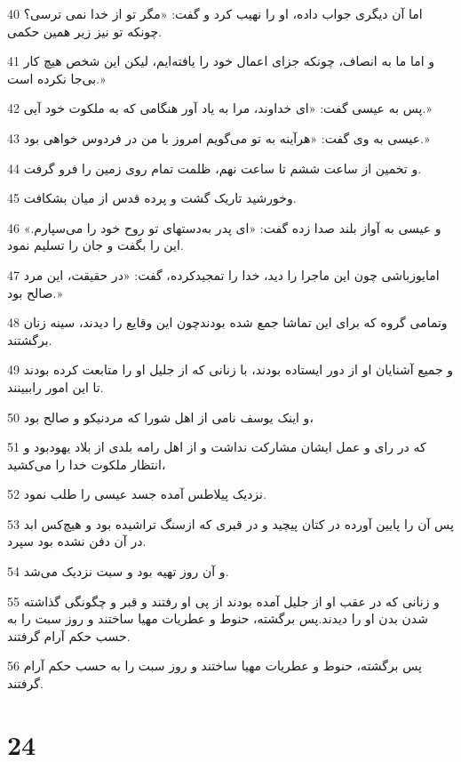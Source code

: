\par 40 اما آن دیگری جواب داده، او را نهیب کرد و گفت: «مگر تو از خدا نمی ترسی؟ چونکه تو نیز زیر همین حکمی.
\par 41 و اما ما به انصاف، چونکه جزای اعمال خود را یافته‌ایم، لیکن این شخص هیچ کار بی‌جا نکرده است.»
\par 42 پس به عیسی گفت: «ای خداوند، مرا به یاد آور هنگامی که به ملکوت خود آیی.»
\par 43 عیسی به وی گفت: «هرآینه به تو می‌گویم امروز با من در فردوس خواهی بود.»
\par 44 و تخمین از ساعت ششم تا ساعت نهم، ظلمت تمام روی زمین را فرو گرفت.
\par 45 وخورشید تاریک گشت و پرده قدس از میان بشکافت.
\par 46 و عیسی به آواز بلند صدا زده گفت: «ای پدر به‌دستهای تو روح خود را می‌سپارم.» این را بگفت و جان را تسلیم نمود.
\par 47 امایوزباشی چون این ماجرا را دید، خدا را تمجیدکرده، گفت: «در حقیقت، این مرد صالح بود.»
\par 48 وتمامی گروه که برای این تماشا جمع شده بودندچون این وقایع را دیدند، سینه زنان برگشتند.
\par 49 و جمیع آشنایان او از دور ایستاده بودند، با زنانی که از جلیل او را متابعت کرده بودند تا این امور راببینند.
\par 50 و اینک یوسف نامی از اهل شورا که مردنیکو و صالح بود،
\par 51 که در رای و عمل ایشان مشارکت نداشت و از اهل رامه بلدی از بلاد یهودبود و انتظار ملکوت خدا را می‌کشید،
\par 52 نزدیک پیلاطس آمده جسد عیسی را طلب نمود.
\par 53 پس آن را پایین آورده در کتان پیچید و در قبری که ازسنگ تراشیده بود و هیچ‌کس ابد در آن دفن نشده بود سپرد.
\par 54 و آن روز تهیه بود و سبت نزدیک می‌شد.
\par 55 و زنانی که در عقب او از جلیل آمده بودند از پی او رفتند و قبر و چگونگی گذاشته شدن بدن او را دیدند.پس برگشته، حنوط و عطریات مهیا ساختند و روز سبت را به حسب حکم آرام گرفتند.
\par 56 پس برگشته، حنوط و عطریات مهیا ساختند و روز سبت را به حسب حکم آرام گرفتند.

\chapter{24}

